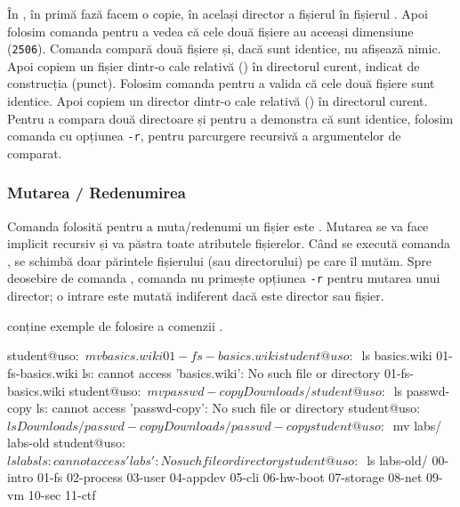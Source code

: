 În , în primă fază facem o copie, în același director a fișierul  în fișierul .
Apoi folosim comanda  pentru a vedea că cele două fișiere au aceeași dimensiune (\texttt{2506}).
Comanda  compară două fișiere și, dacă sunt identice, nu afișează nimic.
Apoi copiem un fișier dintr-o cale relativă () în directorul curent, indicat de construcția  (punct).
Folosim comanda  pentru a valida că cele două fișiere sunt identice.
Apoi copiem un director dintr-o cale relativă () în directorul curent.
Pentru a compara două directoare și pentru a demonstra că sunt identice, folosim comanda  cu opțiunea \texttt{-r}, pentru parcurgere recursivă a argumentelor de comparat.

\subsubsection{Mutarea / Redenumirea}
\label{sec:fs:mv}

Comanda folosită pentru a muta/redenumi un fișier este .
Mutarea se va face implicit recursiv și va păstra toate atributele fișierelor.
Când se execută comanda , se schimbă doar părintele fișierului (sau directorului) pe care îl mutăm.
Spre deosebire de comanda , comanda  nu primește opțiunea \texttt{-r} pentru mutarea unui director;
o intrare este mutată indiferent dacă este director sau fișier.

 conține exemple de folosire a comenzii .

\begin{screen}[caption={Mutarea / Redenumirea fișierelor și directoarelor},label={lst:fs:mv}]
student@uso:~$ mv basics.wiki 01-fs-basics.wiki
student@uso:~$ ls basics.wiki 01-fs-basics.wiki
ls: cannot access 'basics.wiki': No such file or directory
01-fs-basics.wiki
student@uso:~$ mv passwd-copy Downloads/
student@uso:~$ ls passwd-copy
ls: cannot access 'passwd-copy': No such file or directory
student@uso:~$ ls Downloads/passwd-copy
Downloads/passwd-copy
student@uso:~$ mv labs/ labs-old
student@uso:~$ ls labs
ls: cannot access 'labs': No such file or directory
student@uso:~$ ls labs-old/
00-intro  01-fs  02-process  03-user  04-appdev  05-cli  06-hw-boot  07-storage  08-net  09-vm  10-sec  11-ctf
\end{screen}

